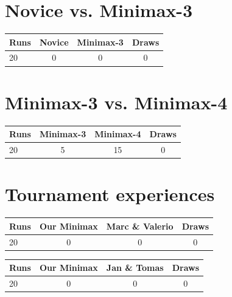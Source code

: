 \documentclass{scrartcl}
\begin{document}
\section{Novice vs. Minimax-3}

\begin{tabular}{l c c c}
Runs & Novice & Minimax-3 & Draws \\
\hline
20 & 0 & 0 & 0  \\
\end{tabular}

\section{Minimax-3 vs. Minimax-4}

\begin{tabular}{l c c c}
Runs & Minimax-3 & Minimax-4 & Draws \\
\hline
20 & 5 & 15 & 0  \\
\end{tabular}

\section{Tournament experiences}

\begin{tabular}{l c c c}
Runs & Our Minimax & Marc \& Valerio & Draws \\
\hline
20 & 0 & 0 & 0  \\
\end{tabular}

\begin{tabular}{l c c c}
Runs & Our Minimax & Jan \& Tomas & Draws \\
\hline
20 & 0 & 0 & 0  \\
\end{tabular}
\end{document}
